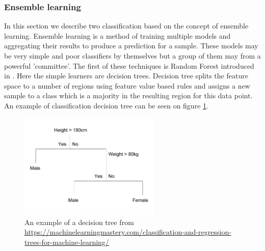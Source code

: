 \documentclass[12pt, wide]{mwart}
\begin{document}
\subsubsection{Ensemble learning}

In this section we describe two classification based on the concept of ensemble learning. Ensemble learning is a method of training multiple models and aggregating their results to produce a prediction for a sample. These models may be very simple and poor classifiers by themselves but a group of them may from a powerful 'committee'. The first of these techniques is Random Forest introduced in \cite{RF}. Here the simple learners are decision trees. Decision tree splits the feature space to a number of regions using feature value based rules and assigns a new sample to a class which is a majority in the resulting region for this data point. An example of classification decision tree can be seen on figure \ref{fig:decision-tree}.

\begin{figure}
\centering
\includegraphics[width=0.6\textwidth]{images/decision_tree.png}
\caption{An example of a decision tree from \url{https://machinelearningmastery.com/classification-and-regression-trees-for-machine-learning/}}
\label{fig:decision-tree}
\end{figure}
\end{document}

